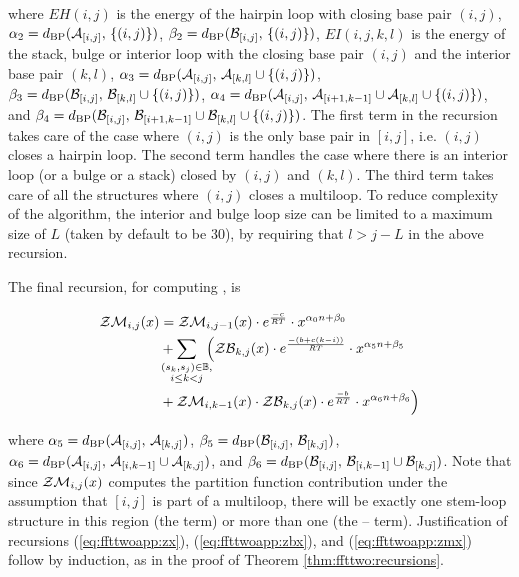 where
$EH(i,j)$ is the energy of the hairpin loop with closing base pair $(i,j)$,
$\alpha_2 = d_{\text{BP}}(\mathcal A_{[i,j]},\,\{(i,j)\})$,
$\beta_2 = d_{\text{BP}}(\mathcal B_{[i,j]},\,\{(i,j)\})$,
$EI(i,j,k,l)$ is the energy of the stack, bulge or
interior loop with the closing base pair $(i,j)$ and the interior
base pair $(k,l)$,
$\alpha_3 = d_{\text{BP}}(\mathcal A_{[i,j]},\,\mathcal A_{[k,l]} \cup \{(i,j)\})$,
$\beta_3 = d_{\text{BP}}(\mathcal B_{[i,j]},\,\mathcal B_{[k,l]} \cup \{(i,j)\})$,
$\alpha_4 = d_{\text{BP}}(\mathcal A_{[i,j]},\,\mathcal A_{[i+1,k-1]} \cup
\mathcal A_{[k,l]} \cup\{(i,j)\})$, and
$\beta_4 = d_{\text{BP}}(\mathcal B_{[i,j]},\,\mathcal B_{[i+1,k-1]} \cup
\mathcal B_{[k,l]} \cup\{(i,j)\})$.
The first term in the
recursion takes care of the case where $(i,j)$ is the only base pair
in $[i,j]$, i.e. $(i,j)$ closes a hairpin loop. The second term
handles the case where there is an interior loop (or a bulge or a
stack) closed by $(i,j)$ and $(k,l)$. The third term takes care of
all the structures where $(i,j)$ closes a multiloop. To reduce
complexity of the algorithm, the interior and bulge loop size can be
limited to a maximum size of $L$ (taken by default to be 30),
by requiring that $l>j-L$ in the above recursion.

The final recursion, for computing \emZM{}, is

\begin{align}
\label{eq:ffttwoapp:zmx}
\begin{split}
\emZM{i,j} &= \emZM{i,j-1} \cdot \boltzE{c} \cdot x^{\ab{0}} \\
&+ \sum_{\mathclap{\substack{(s_k,s_j) \in \bpSet, \\ i \leq k < j }}}\enspace
\Big( \emZB{k,j} \cdot \boltzE{(b+c(k-i))} \cdot x^{\ab{5}} \\
&+ \emZM{i,k-1} \cdot \emZB{k,j} \cdot \boltzE{b} \cdot x^{\ab{6}} \Big)
\end{split}
\end{align}

where
$\alpha_5 = d_{\text{BP}}(\mathcal A_{[i,j]},\,\mathcal A_{[k,j]})$,
$\beta_5 = d_{\text{BP}}(\mathcal B_{[i,j]},\,\mathcal B_{[k,j]})$,
$\alpha_6 =d_{\text{BP}}(\mathcal A_{[i,j]},\,\mathcal A_{[i,k-1]} \cup \mathcal A_{[k,j]})$, and
$\beta_6 =d_{\text{BP}}(\mathcal B_{[i,j]},\,\mathcal B_{[i,k-1]} \cup \mathcal B_{[k,j]})$.
Note that since $\mathcal{ZM}_{i,j}(x)$ computes the partition function
contribution under the assumption that $[i,j]$ is part of a
multiloop, there will be exactly one stem-loop structure in this
region (the \emZB{} term) or
more than one (the \emZM{}--\emZB{} term).
Justification of recursions (\ref{eq:ffttwoapp:zx}),
(\ref{eq:ffttwoapp:zbx}), and
(\ref{eq:ffttwoapp:zmx})
follow by induction, as in the proof of Theorem \ref{thm:ffttwo:recursions}.

